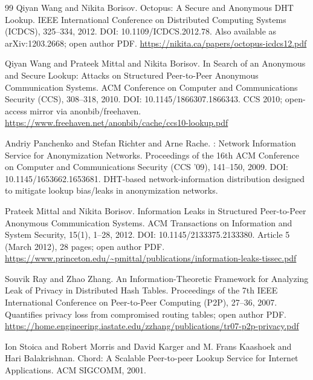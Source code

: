 \documentclass[11pt]{article}
\begin{document}
\begin{thebibliography}{99}
Qiyan Wang and Nikita Borisov.
\newblock Octopus: A Secure and Anonymous {DHT} Lookup.
\newblock IEEE International Conference on Distributed Computing Systems (ICDCS), 325--334, 2012.
\newblock DOI: 10.1109/ICDCS.2012.78.
\newblock Also available as arXiv:1203.2668; open author PDF.
\newblock \url{https://nikita.ca/papers/octopus-icdcs12.pdf}

Qiyan Wang and Prateek Mittal and Nikita Borisov.
\newblock In Search of an Anonymous and Secure Lookup: Attacks on Structured Peer-to-Peer Anonymous Communication Systems.
\newblock ACM Conference on Computer and Communications Security (CCS), 308--318, 2010.
\newblock DOI: 10.1145/1866307.1866343.
\newblock CCS 2010; open-access mirror via anonbib/freehaven.
\newblock \url{https://www.freehaven.net/anonbib/cache/ccs10-lookup.pdf}

Andriy Panchenko and Stefan Richter and Arne Rache.
: Network Information Service for Anonymization Networks.
\newblock Proceedings of the 16th {ACM} Conference on Computer and Communications Security (CCS '09), 141--150, 2009.
\newblock DOI: 10.1145/1653662.1653681.
\newblock DHT-based network-information distribution designed to mitigate lookup bias/leaks in anonymization networks.

Prateek Mittal and Nikita Borisov.
\newblock Information Leaks in Structured Peer-to-Peer Anonymous Communication Systems.
\newblock ACM Transactions on Information and System Security, 15(1), 1--28, 2012.
\newblock DOI: 10.1145/2133375.2133380.
\newblock Article 5 (March 2012), 28 pages; open author PDF.
\newblock \url{https://www.princeton.edu/~pmittal/publications/information-leaks-tissec.pdf}

Souvik Ray and Zhao Zhang.
\newblock An Information-Theoretic Framework for Analyzing Leak of Privacy in Distributed Hash Tables.
\newblock Proceedings of the 7th {IEEE} International Conference on Peer-to-Peer Computing (P2P), 27--36, 2007.
\newblock Quantifies privacy loss from compromised routing tables; open author PDF.
\newblock \url{https://home.engineering.iastate.edu/zzhang/publications/tr07-p2p-privacy.pdf}

Ion Stoica and Robert Morris and David Karger and M. Frans Kaashoek and Hari Balakrishnan.
\newblock Chord: A Scalable Peer-to-peer Lookup Service for Internet Applications.
\newblock ACM SIGCOMM, 2001.


\end{thebibliography}
\end{document}
